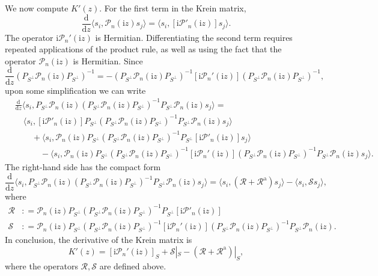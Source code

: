 \documentclass[review,onefignum,onetabnum]{siamart171218}
\def\coloneqq{\mathrel{\mathop:}=}
\newcommand{\rma}{\mathrm{a}}
\newcommand{\rmd}{\mathrm{d}}
\newcommand{\rmi}{\mathrm{i}}
\newcommand{\calP}{\mathcal{P}}
\newcommand{\calR}{\mathcal{R}}
\newcommand{\calS}{\mathcal{S}}
\newcommand{\vK}{\bm{\mathit{K}}}
\begin{document}
We now compute $\vK'(z)$. For the first term in the Krein matrix,
\[
\frac{\rmd}{\rmd z}\langle s_i,\calP_n(\rmi z)s_j\rangle=
\langle s_i,[\rmi\calP'_n(\rmi z)]s_j\rangle.
\]
The operator $\rmi\calP_n'(\rmi z)$ is Hermitian. Differentiating the second term requires
repeated applications of the product rule, as well as using the fact that the
operator $\calP_n(\rmi z)$ is Hermitian. Since
\[
\frac{\rmd}{\rmd z}(P_{S^\perp}\calP_n(\rmi z)P_{S^\perp})^{-1}=
-(P_{S^\perp}\calP_n(\rmi z)P_{S^\perp})^{-1}[\rmi\calP_n'(\rmi z)]
(P_{S^\perp}\calP_n(\rmi z)P_{S^\perp})^{-1},
\]
upon some simplification we can write
\[
\begin{aligned}
&\frac{\rmd}{\rmd z}\langle s_i,P_{S^\perp}\calP_n(\rmi z)(P_{S^\perp}\calP_n(\rmi z)P_{S^\perp})^{-1}P_{S^\perp}\calP_n(\rmi z)s_j\rangle=\\
&\quad\langle s_i,[\rmi\calP'_n(\rmi z)]P_{S^\perp}(P_{S^\perp}\calP_n(\rmi z)P_{S^\perp})^{-1}P_{S^\perp}\calP_n(\rmi z)s_j\rangle\\
&\qquad+\langle s_i,\calP_n(\rmi z)P_{S^\perp}(P_{S^\perp}\calP_n(\rmi z)P_{S^\perp})^{-1}P_{S^\perp}[\rmi\calP'_n(\rmi z)]s_j\rangle\\
&\qquad\quad-\langle s_i,\calP_n(\rmi z)P_{S^\perp}(P_{S^\perp}\calP_n(\rmi z)P_{S^\perp})^{-1}[\rmi\calP_n'(\rmi z)]
(P_{S^\perp}\calP_n(\rmi z)P_{S^\perp})^{-1}P_{S^\perp}\calP_n(\rmi z)s_j\rangle.
\end{aligned}
\]
The right-hand side has the compact form
\[
\frac{\rmd}{\rmd z}\langle s_i,P_{S^\perp}\calP_n(\rmi z)(P_{S^\perp}\calP_n(\rmi z)P_{S^\perp})^{-1}P_{S^\perp}\calP_n(\rmi z)s_j\rangle=
\langle s_i,(\calR+\calR^\rma)s_j\rangle-\langle s_i,\calS s_j\rangle,
\]
where
\begin{equation*}
\begin{aligned}
\calR&\coloneqq\calP_n(\rmi z)P_{S^\perp}(P_{S^\perp}\calP_n(\rmi z)P_{S^\perp})^{-1}P_{S^\perp}[\rmi\calP'_n(\rmi z)]\\
\calS&\coloneqq\calP_n(\rmi z)P_{S^\perp}(P_{S^\perp}\calP_n(\rmi z)P_{S^\perp})^{-1}[\rmi\calP_n'(\rmi z)]
(P_{S^\perp}\calP_n(\rmi z)P_{S^\perp})^{-1}P_{S^\perp}\calP_n(\rmi z).
\end{aligned}
\end{equation*}
In conclusion, the derivative
of the Krein matrix is
\begin{equation}\label{e:32}
\vK'(z)=[\rmi\calP_n'(\rmi z)]_S+\calS|_S-(\calR+\calR^\rma)|_S,
\end{equation}
where the operators $\calR,\calS$ are defined above.
\end{document}
